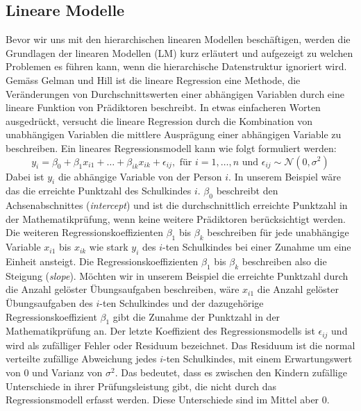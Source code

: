 \documentclass[12pt]{article}\usepackage[]{graphicx}\usepackage[]{color}
\begin{document}
\subsection{Lineare Modelle} \label{section:linear_model}
Bevor wir uns mit den hierarchischen linearen Modellen beschäftigen, werden die Grundlagen der linearen Modellen (LM) kurz erläutert und aufgezeigt zu welchen Problemen es führen kann, wenn die hierarchische Datenstruktur ignoriert wird. Gemäss Gelman und Hill \citeyearpar{andrew_data} ist die lineare Regression eine Methode, die Veränderungen von Durchschnittswerten einer abhängigen Variablen durch eine lineare Funktion von Prädiktoren beschreibt. In etwas einfacheren Worten ausgedrückt, versucht die lineare Regression durch die Kombination von unabhängigen Variablen die mittlere Ausprägung einer abhängigen Variable zu beschreiben. Ein lineares Regressionsmodell kann wie folgt formuliert werden:
\begin{equation} \label{eq:ols_model}
y_{i} = \beta_{0} + \beta_{1}x_{i1} + \dots + \beta_{ik}x_{ik} + \epsilon_{ij}, \text{ für } i = 1, \dots, n \text{ und } \epsilon_{ij} \sim \mathcal{N}(0,\sigma^{2})
\end{equation}
Dabei ist $y_{i}$ die abhängige Variable von der Person $i$. In unserem Beispiel wäre das die erreichte Punktzahl des Schulkindes $i$. $\beta_0$ beschreibt den Achsenabschnittes (\textit{intercept}) und ist die durchschnittlich erreichte Punktzahl in der Mathematikprüfung, wenn keine weitere Prädiktoren berücksichtigt werden. Die weiteren Regressionskoeffizienten $\beta_{1}$ bis $\beta_{k}$ beschreiben für jede unabhängige Variable $x_{i1}$ bis $x_{ik}$ wie stark $y_{i}$ des $i$-ten Schulkindes bei einer Zunahme um eine Einheit ansteigt. Die Regressionskoeffizienten $\beta_{1}$ bis $\beta_{k}$ beschreiben also die Steigung (\textit{slope}). Möchten wir in unserem Beispiel die erreichte Punktzahl durch die Anzahl gelöster Übungsaufgaben beschreiben, wäre $x_{i1}$ die Anzahl gelöster Übungsaufgaben des $i$-ten Schulkindes und der dazugehörige Regressionskoeffizient $\beta_{1}$ gibt die Zunahme der Punktzahl in der Mathematikprüfung an. Der letzte Koeffizient des Regressionsmodells ist $\epsilon_{ij}$ und wird als zufälliger Fehler oder Residuum bezeichnet. Das Residuum ist die normal verteilte zufällige Abweichung jedes $i$-ten Schulkindes, mit einem Erwartungswert von 0 und Varianz von $\sigma^{2}$. Das bedeutet, dass es zwischen den Kindern zufällige Unterschiede in ihrer Prüfungsleistung gibt, die nicht durch das Regressionsmodell erfasst werden. Diese Unterschiede sind im Mittel aber 0. 
\end{document}

